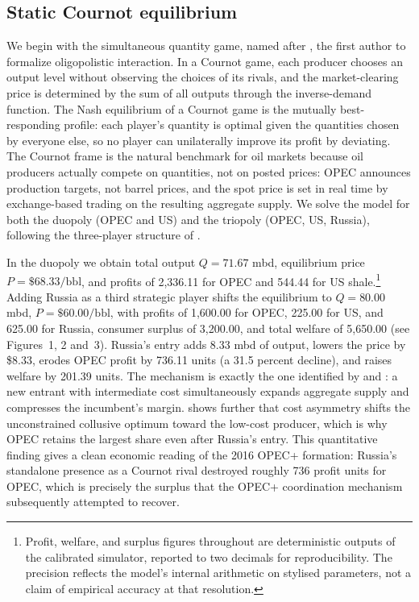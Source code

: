 \subsection{Static Cournot equilibrium}
\label{subsec:cournot}

We begin with the simultaneous quantity game, named after
\citet[p.~??]{cournot1838}, the first author to formalize oligopolistic
interaction. In a Cournot game, each producer chooses an output level
without observing the choices of its rivals, and the market-clearing
price is determined by the sum of all outputs through the inverse-demand
function. The Nash equilibrium of a Cournot game is the mutually
best-responding profile: each player's quantity is optimal given the
quantities chosen by everyone else, so no player can unilaterally
improve its profit by deviating. The Cournot frame is the natural
benchmark for oil markets because oil producers actually compete on
quantities, not on posted prices: OPEC announces production targets, not
barrel prices, and the spot price is set in real time by exchange-based
trading on the resulting aggregate supply. We solve the model for both
the duopoly (OPEC and US) and the triopoly (OPEC, US, Russia), following
the three-player structure of \citet{alcelay2017}.

In the duopoly we obtain total output $Q = 71.67$ mbd, equilibrium price
$P = \$68.33/\text{bbl}$, and profits of 2,336.11 for OPEC and 544.44
for US shale.\footnote{Profit, welfare, and surplus figures throughout
are deterministic outputs of the calibrated simulator, reported to two
decimals for reproducibility. The precision reflects the model's
internal arithmetic on stylised parameters, not a claim of empirical
accuracy at that resolution.} Adding Russia as a third strategic player shifts the
equilibrium to $Q = 80.00$ mbd, $P = \$60.00/\text{bbl}$, with profits
of 1,600.00 for OPEC, 225.00 for US, and 625.00 for Russia, consumer
surplus of 3,200.00, and total welfare of 5,650.00 (see Figures~1,
2 and~3). Russia's entry adds 8.33 mbd of output, lowers the price by
\$8.33, erodes OPEC profit by 736.11 units (a 31.5 percent decline), and
raises welfare by 201.39 units. The mechanism is exactly the one
identified by \citet{salant1976} and \citet{novshek1985}: a new entrant
with intermediate cost simultaneously expands aggregate supply and
compresses the incumbent's margin. \citet{schmalensee1987} shows further
that cost asymmetry shifts the unconstrained collusive optimum toward
the low-cost producer, which is why OPEC retains the largest share even
after Russia's entry. This quantitative finding gives a clean economic
reading of the 2016 OPEC+ formation: Russia's standalone presence as a
Cournot rival destroyed roughly 736 profit units for OPEC, which is
precisely the surplus that the OPEC+ coordination mechanism subsequently
attempted to recover.

